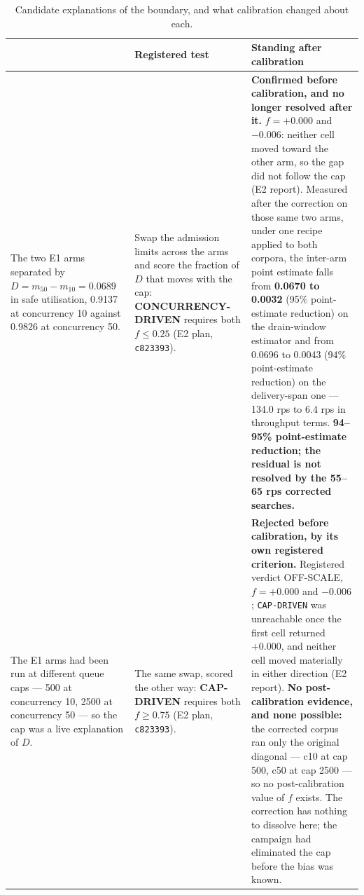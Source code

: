\documentclass{ieeeaccess}
\begin{document}
\begin{table}[!t]
\caption[Candidate explanations of the boundary, and what calibration changed about each.]{Candidate explanations of the boundary, and what calibration changed about each.}
\label{tab:candidates}
\centering
\footnotesize
\begin{tabularx}{\textwidth}{>{\raggedright\arraybackslash}X>{\raggedright\arraybackslash}X>{\raggedright\arraybackslash}X}
\hline
{\bfseries Candidate explanation} & {\bfseries Registered test} & {\bfseries Standing after calibration} \\ \hline
{\bfseries The boundary depended on concurrency.} The two E1 arms separated by $D = m_{50} - m_{10} = 0.0689$ in safe utilisation, 0.9137 at concurrency 10 against 0.9826 at concurrency 50. & Swap the admission limits across the arms and score the fraction of $D$ that moves with the cap: {\bfseries CONCURRENCY-DRIVEN} requires both $f \leq 0.25$ (E2 plan, \texttt{c823393}). & {\bfseries Confirmed before calibration, and no longer resolved after it.} $f = +0.000$ and $-0.006$: neither cell moved toward the other arm, so the gap did not follow the cap (E2 report). Measured after the correction on those same two arms, under one recipe applied to both corpora, the inter-arm point estimate falls from {\bfseries 0.0670 to 0.0032} (95\% point-estimate reduction) on the drain-window estimator and from 0.0696 to 0.0043 (94\% point-estimate reduction) on the delivery-span one --- 134.0 rps to 6.4 rps in throughput terms. {\bfseries 94--95\% point-estimate reduction; the residual is not resolved by the 55--65 rps corrected searches.} \\
{\bfseries The boundary depended on the admission limit.} The E1 arms had been run at different queue caps --- 500 at concurrency 10, 2500 at concurrency 50 --- so the cap was a live explanation of $D$. & The same swap, scored the other way: {\bfseries CAP-DRIVEN} requires both $f \geq 0.75$ (E2 plan, \texttt{c823393}). & {\bfseries Rejected before calibration, by its own registered criterion.} Registered verdict OFF-SCALE, $f = +0.000$ and $-0.006$; \texttt{CAP-DRIVEN} was unreachable once the first cell returned +0.000, and neither cell moved materially in either direction (E2 report). {\bfseries No post-calibration evidence, and none possible:} the corrected corpus ran only the original diagonal --- c10 at cap 500, c50 at cap 2500 --- so no post-calibration value of $f$ exists. The correction has nothing to dissolve here; the campaign had eliminated the cap before the bias was known. \\

\end{tabularx}
\end{table}
\end{document}

